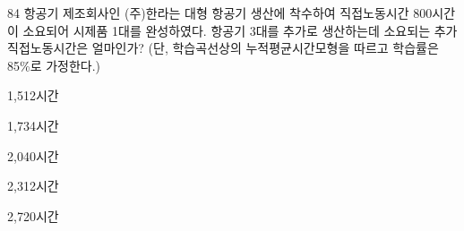 \begin{question}{84}
항공기 제조회사인 (주)한라는 대형 항공기 생산에 착수하여 직접노동시간 800시간이 소요되어 시제품 1대를 완성하였다. 항공기 3대를 추가로 생산하는데 소요되는 추가 직접노동시간은 얼마인가? (단, 학습곡선상의 누적평균시간모형을 따르고 학습률은 85\%로 가정한다.)
\begin{choices}
  \item 1,512시간
  \item 1,734시간
  \item 2,040시간
  \item 2,312시간
  \item 2,720시간
\end{choices}
\end{question}
